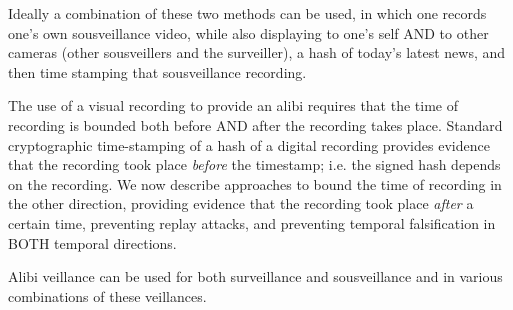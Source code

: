 Ideally a combination of these two methods can be used, in which one
records one's own sousveillance video, while also displaying to one's self
AND to other cameras (other sousveillers and the surveiller), a hash of
today's latest news, and then time stamping that sousveillance recording.


The use of a visual recording to provide an alibi requires that the time of
recording is bounded both before AND after the recording takes place.
Standard cryptographic time-stamping of a hash of a digital recording
provides evidence that the recording took place \emph{before} the
timestamp; i.e. the signed hash depends on the recording.
We now describe approaches to bound the time of recording in
the other direction, providing evidence that the recording took place
\emph{after} a certain time, preventing replay attacks, and preventing
temporal falsification in BOTH temporal directions.

Alibi veillance can be used for both surveillance and sousveillance and
in various combinations of these veillances.

